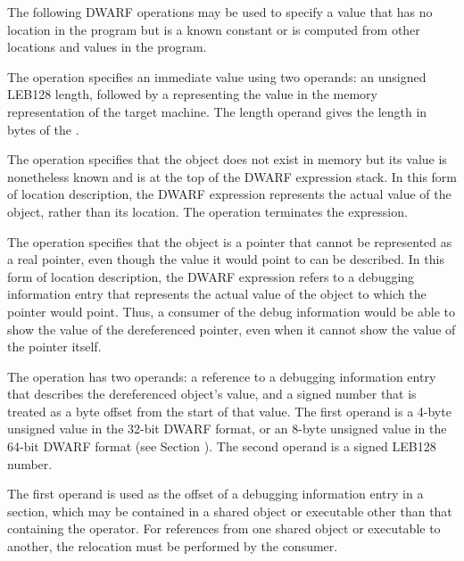 The following DWARF operations may be used to specify a value
that has no location in the program but is a known constant
or is computed from other locations and values in the program.
\begin{enumerate}[1. ]
\itembfnl{\DWOPimplicitvalueTARG}
The \DWOPimplicitvalueTARG{} 
operation specifies an immediate value
using two operands: an unsigned LEB128
length, followed by
a  representing the value in the memory representation
of the target machine. The length operand gives the length
in bytes of the .

\itembfnl{\DWOPstackvalueTARG}
The \DWOPstackvalueTARG{} 
operation specifies that the object
does not exist in memory but its value is nonetheless known
and is at the top of the DWARF expression stack. In this form
of location description, the DWARF expression represents the
actual value of the object, rather than its location. The
\DWOPstackvalueNAME{} operation terminates the expression.

\itembfnl{\DWOPimplicitpointerTARG}
The \DWOPimplicitpointerNAME{} operation specifies that the object
is a pointer that cannot be represented as a real pointer,
even though the value it would point to can be described. In
this form of location description, the DWARF expression refers
to a debugging information entry that represents the actual
value of the object to which the pointer would point. Thus, a
consumer of the debug information would be able to show the
value of the dereferenced pointer, even when it cannot show
the value of the pointer itself.

The \DWOPimplicitpointerNAME{} operation has two operands: a 
reference to a debugging information entry that describes 
the dereferenced object's value, and a signed number that 
is treated as a byte offset from the start of that value. 
The first operand is a 4-byte unsigned value in the 32-bit 
DWARF format, or an 8-byte unsigned value in the 64-bit 
DWARF format (see Section 
).
The second operand is a 
signed LEB128 number.

The first operand is used as the offset of a debugging
information entry in a \dotdebuginfo{} section, which may be
contained in a shared object or executable other than that
containing the operator. For references from one shared object
or executable to another, the relocation must be performed by
the consumer.


\end{enumerate}

